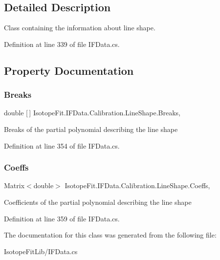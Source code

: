 \subsection{Detailed Description}
Class containing the information about line shape. 



Definition at line 339 of file I\+F\+Data.\+cs.



\subsection{Property Documentation}
\mbox{\label{class_isotope_fit_1_1_i_f_data_1_1_calibration_1_1_line_shape_a447511120da7a7c67677aeb723cffd77}} 
\subsubsection{\texorpdfstring{Breaks}{Breaks}}
{\footnotesize\ttfamily double \mbox{[}$\,$\mbox{]} Isotope\+Fit.\+I\+F\+Data.\+Calibration.\+Line\+Shape.\+Breaks\hspace{0.3cm}{\ttfamily [get]}, {\ttfamily [set]}}



Breaks of the partial polynomial describing the line shape 



Definition at line 354 of file I\+F\+Data.\+cs.

\mbox{\label{class_isotope_fit_1_1_i_f_data_1_1_calibration_1_1_line_shape_a8892e37963113bc557f3324a10ff82a0}} 
\subsubsection{\texorpdfstring{Coeffs}{Coeffs}}
{\footnotesize\ttfamily Matrix$<$double$>$ Isotope\+Fit.\+I\+F\+Data.\+Calibration.\+Line\+Shape.\+Coeffs\hspace{0.3cm}{\ttfamily [get]}, {\ttfamily [set]}}



Coefficients of the partial polynomial describing the line shape 



Definition at line 359 of file I\+F\+Data.\+cs.



The documentation for this class was generated from the following file\+:\begin{DoxyCompactItemize}
\item 
Isotope\+Fit\+Lib/I\+F\+Data.\+cs\end{DoxyCompactItemize}
